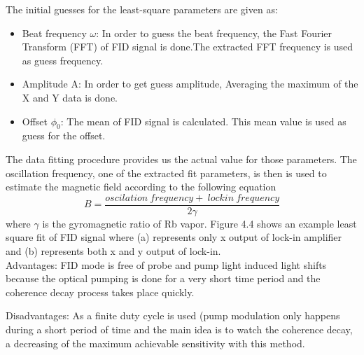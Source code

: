 \begin{itemize}
The initial guesses for the least-square parameters are given
as:
\begin{itemize}
\item
Beat frequency $\omega$: In order to guess the beat frequency, the Fast Fourier Transform (FFT) of FID signal is done.The extracted FFT frequency is used as guess frequency.
\item
Amplitude A: In order to get guess amplitude, Averaging the maximum of the X and Y data is done.
\item
Offset $\phi_0$: The mean of FID signal is calculated. This mean value is used as guess for the offset. 

\end{itemize}
The data fitting procedure provides us the actual value for those parameters. The oscillation frequency, one of the extracted fit parameters, is then is used to estimate the magnetic field according to the following equation
\begin{equation}
B= \frac{oscilation ~ frequency +~lock in~ frequency}{2\gamma}
\end{equation}
where $\gamma$ is the gyromagnetic ratio of Rb vapor. Figure 4.4 shows an example least square fit of FID signal where (a) represents only x output of lock-in amplifier and (b) represents both x and y output of lock-in.\\
Advantages: FID mode is free of probe and pump light induced light shifts because the optical pumping is done for a very short time period and the coherence decay process takes place quickly. 

Disadvantages: As a finite duty cycle is used (pump modulation only happens during a short period of time and the main idea is to watch the coherence decay, a decreasing of the maximum achievable sensitivity with this method.


\end{itemize}

